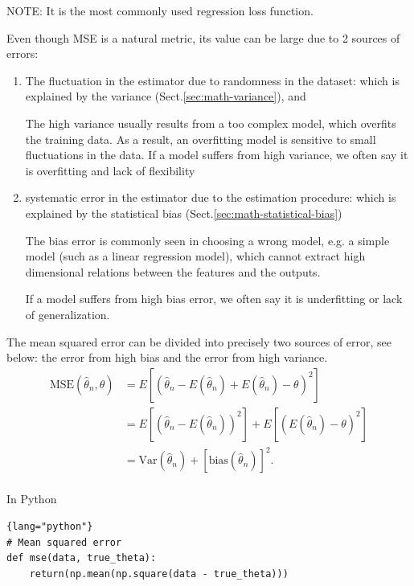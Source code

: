 NOTE: It is the most commonly used regression loss function. 

Even though MSE is a natural metric, its value can be large due to 2 sources of errors:
\begin{enumerate}
  \item The fluctuation in the estimator due to randomness in the dataset: which is explained by the 
  variance (Sect.\ref{sec:math-variance}), and
  
  The high variance usually results from a too complex model, which overfits the
  training data.
  As a result, an overfitting model is sensitive to small fluctuations in the
  data. If a model suffers from high variance, we often say it is overfitting
  and lack of flexibility
  
  \item systematic error in the estimator due to the estimation procedure: which
  is explained by the statistical bias (Sect.\ref{sec:math-statistical-bias})
  
  The bias error is commonly seen in choosing a wrong model, e.g. a simple model
  (such as a linear regression model), which cannot extract high dimensional
  relations between the features and the outputs.
  
  If a model suffers from high bias error, we often say it is underfitting or
  lack of generalization.
  
\end{enumerate}

The mean squared error can be divided into precisely two sources of error, see below: the
error from high bias and the error from high variance. 
\begin{equation}
\begin{aligned}
\mathrm{MSE} (\hat{\theta}_n, \theta) &= E[(\hat{\theta}_n - E(\hat{\theta}_n) + E(\hat{\theta}_n) - \theta)^2] \\
 &= E[(\hat{\theta}_n - E(\hat{\theta}_n))^2] + E[(E(\hat{\theta}_n) - \theta)^2] \\
 &= \mathrm{Var} (\hat{\theta}_n) + [\mathrm{bias} (\hat{\theta}_n)]^2.\\
\end{aligned}
\end{equation}

In Python
\begin{lstlisting}{lang="python"}
# Mean squared error
def mse(data, true_theta):
    return(np.mean(np.square(data - true_theta)))
\end{lstlisting}

